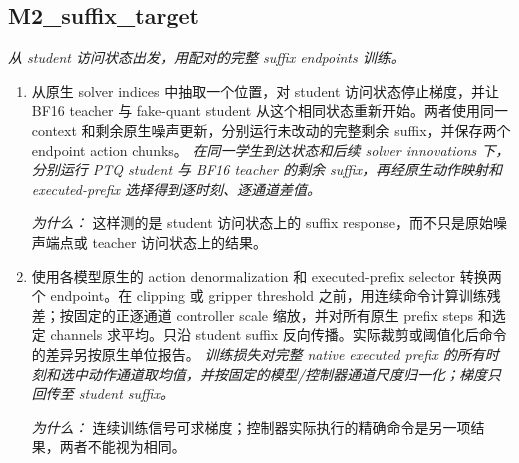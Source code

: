 \documentclass[10pt,a4paper]{article}
\begin{document}
\subsection*{M2\_suffix\_target}
\emph{从 student 访问状态出发，用配对的完整 suffix endpoints 训练。}
\begin{enumerate}[leftmargin=*,start=3]
  \item 从原生 solver indices 中抽取一个位置，对 student 访问状态停止梯度，并让 BF16 teacher 与 fake-quant student 从这个相同状态重新开始。两者使用同一 context 和剩余原生噪声更新，分别运行未改动的完整剩余 suffix，并保存两个 endpoint action chunks。
\noindent\emph{在同一学生到达状态和后续 solver innovations 下，分别运行 PTQ student 与 BF16 teacher 的剩余 suffix，再经原生动作映射和 executed-prefix 选择得到逐时刻、逐通道差值。}
\par{}
\par\emph{为什么：} 这样测的是 student 访问状态上的 suffix response，而不只是原始噪声端点或 teacher 访问状态上的结果。
  \item 使用各模型原生的 action denormalization 和 executed-prefix selector 转换两个 endpoint。在 clipping 或 gripper threshold 之前，用连续命令计算训练残差；按固定的正逐通道 controller scale 缩放，并对所有原生 prefix steps 和选定 channels 求平均。只沿 student suffix 反向传播。实际裁剪或阈值化后命令的差异另按原生单位报告。
\noindent\emph{训练损失对完整 native executed prefix 的所有时刻和选中动作通道取均值，并按固定的模型/控制器通道尺度归一化；梯度只回传至 student suffix。}
\par{}
\par\emph{为什么：} 连续训练信号可求梯度；控制器实际执行的精确命令是另一项结果，两者不能视为相同。
\end{enumerate}
\end{document}
